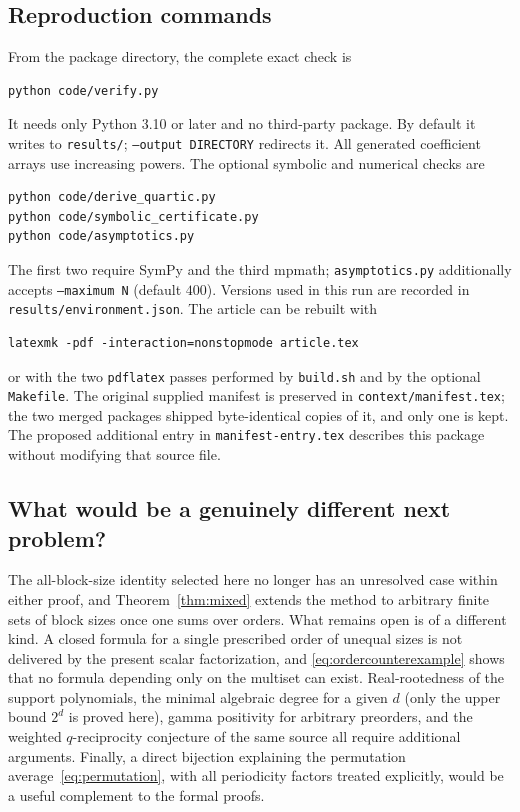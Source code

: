 \documentclass[11pt]{article}
\numberwithin{equation}{section}
\theoremstyle{definition}
\begin{document}
\subsection{Reproduction commands}
From the package directory, the complete exact check is
\begin{lstlisting}
python code/verify.py
\end{lstlisting}
It needs only Python 3.10 or later and no third-party package. By default it
writes to \texttt{results/}; \texttt{--output DIRECTORY} redirects it. All
generated coefficient arrays use increasing powers. The optional symbolic and
numerical checks are
\begin{lstlisting}
python code/derive_quartic.py
python code/symbolic_certificate.py
python code/asymptotics.py
\end{lstlisting}
The first two require SymPy and the third mpmath; \texttt{asymptotics.py}
additionally accepts \texttt{--maximum N} (default $400$). Versions used in
this run are recorded in \texttt{results/environment.json}. The article can be
rebuilt with
\begin{lstlisting}
latexmk -pdf -interaction=nonstopmode article.tex
\end{lstlisting}
or with the two \texttt{pdflatex} passes performed by \texttt{build.sh} and by
the optional \texttt{Makefile}.
The original supplied manifest is preserved in \texttt{context/manifest.tex};
the two merged packages shipped byte-identical copies of it, and only one is
kept. The proposed additional entry in \texttt{manifest-entry.tex} describes
this package without modifying that source file.

\subsection{What would be a genuinely different next problem?}
The all-block-size identity selected here no longer has an unresolved case
within either proof, and Theorem~\ref{thm:mixed} extends the method to
arbitrary finite sets of block sizes once one sums over orders. What remains
open is of a different kind. A closed formula for a single prescribed order of
unequal sizes is not delivered by the present scalar factorization, and
\eqref{eq:ordercounterexample} shows that no formula depending only on the
multiset can exist. Real-rootedness of the support polynomials, the minimal
algebraic degree for a given $d$ (only the upper bound $2^d$ is proved here),
gamma positivity for arbitrary preorders, and the weighted $q$-reciprocity
conjecture of the same source all require additional arguments. Finally, a
direct bijection explaining the permutation average~\eqref{eq:permutation},
with all periodicity factors treated explicitly, would be a useful complement
to the formal proofs.
\end{document}
